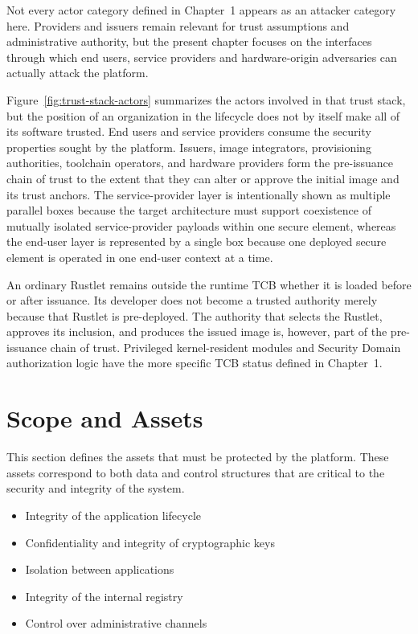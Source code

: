Not every actor category defined in Chapter~1 appears as an attacker category
here. Providers and issuers remain relevant for trust assumptions and
administrative authority, but the present chapter focuses on the interfaces
through which end users, service providers and hardware-origin adversaries can
actually attack the platform.

Figure~\ref{fig:trust-stack-actors} summarizes the actors involved in that trust
stack, but the position of an organization in the lifecycle does not by itself
make all of its software trusted. End users and service providers consume the
security properties sought by the platform. Issuers, image integrators,
provisioning authorities, toolchain operators, and hardware providers form the
pre-issuance chain of trust to the extent that they can alter or approve the
initial image and its trust anchors. The service-provider layer is intentionally
shown as multiple parallel boxes because the target architecture must support
coexistence of mutually isolated service-provider payloads within one secure
element, whereas the end-user layer is represented by a single box because one
deployed secure element is operated in one end-user context at a time.

An ordinary Rustlet remains outside the runtime TCB whether it is loaded before
or after issuance. Its developer does not become a trusted authority merely
because that Rustlet is pre-deployed. The authority that selects the Rustlet,
approves its inclusion, and produces the issued image is, however, part of the
pre-issuance chain of trust. Privileged kernel-resident modules and Security
Domain authorization logic have the more specific TCB status defined in
Chapter~1.

\section{Scope and Assets}

This section defines the assets that must be protected by the platform. These
assets correspond to both data and control structures that are critical to the
security and integrity of the system.

\begin{itemize}
\item Integrity of the application lifecycle
\item Confidentiality and integrity of cryptographic keys
\item Isolation between applications
\item Integrity of the internal registry
\item Control over administrative channels
\end{itemize}

